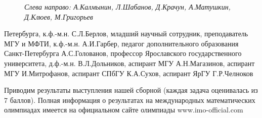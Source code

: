 \begin{multicols}{2}
\begin{figure}[H]
        \captionsetup{font=scriptsize,labelformat=empty}
        \caption{\textit{Слева направо: А.Калмынин, Л.Шабанов, Д.Крачун, А.Матушкин, Д.Клюев, М.Григорьев}}
    \end{figure}
    \vspace{-\baselineskip}
    {\par \hspace*{0.2cm}Петербурга, к.ф.-м.н. С.Л.Берлов, младший научный сотрудник, преподаватель МГУ и МФТИ, к.ф.-м.н. А.И.Гарбер, педагог дополнительного образования Санкт-Петербурга А.С.Голованов, профессор Ярославского государственного университета, д.ф.-м.н. В.Л.Дольников, аспирант МГУ А.Н.Магазинов, аспирант МГУ И.Митрофанов, аспирант СПбГУ К.А.Сухов, аспирант ЯрГУ Г.Р.Челноков}
    {\par \hspace*{0.2cm}Приводим результаты выступления нашей сборной (каждая задача оценивалась из 7 баллов). Полная информация о результатах на международных математических олимпиадах имеется на официальном сайте олимпиады www.imo-official.com}
\end{multicols}
\newpage
{} %
